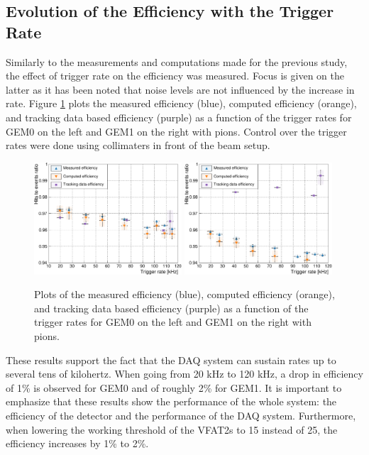     \subsection{Evolution of the Efficiency with the Trigger Rate}

      Similarly to the measurements and computations made for the previous study, the effect of trigger rate on the efficiency was measured. Focus is given on the latter as it has been noted that noise levels are not influenced by the increase in rate. Figure \ref{fig:II-3-data-eff-rate} plots the measured efficiency (blue), computed efficiency (orange), and tracking data based efficiency (purple) as a function of the trigger rates for GEM0 on the left and GEM1 on the right with pions. Control over the trigger rates were done using collimaters in front of the beam setup. \\

      \begin{figure}[h!]
        \centering
        \includegraphics[width=0.49\textwidth]{img/plots/cEfficiency_Rate_GEM0-crop}
        \includegraphics[width=0.49\textwidth]{img/plots/cEfficiency_Rate_GEM1-crop}
        \caption{Plots of the measured efficiency (blue), computed efficiency (orange), and tracking data based efficiency (purple) as a function of the trigger rates for GEM0 on the left and GEM1 on the right with pions.}
        \label{fig:II-3-data-eff-rate}
      \end{figure}

      These results support the fact that the DAQ system can sustain rates up to several tens of kilohertz. When going from 20 kHz to 120 kHz, a drop in efficiency of 1\% is observed for GEM0 and of roughly 2\% for GEM1. It is important to emphasize that these results show the performance of the whole system: the efficiency of the detector and the performance of the DAQ system. Furthermore, when lowering the working threshold of the VFAT2s to 15 instead of 25, the efficiency increases by 1\% to 2\%.

